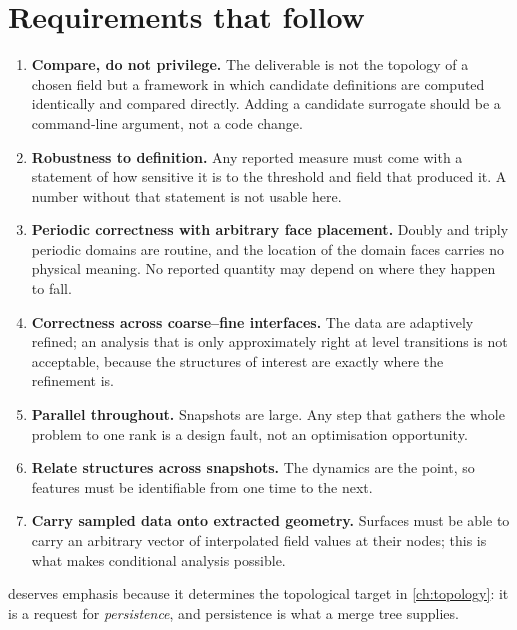 \section{Requirements that follow}

\begin{enumerate}[label=(R\arabic*),leftmargin=*]
\item\label{req:compare} \textbf{Compare, do not privilege.} The deliverable is
  not the topology of a chosen field but a framework in which candidate
  definitions are computed identically and compared directly. Adding a
  candidate surrogate should be a command-line argument, not a code change.
\item\label{req:robust} \textbf{Robustness to definition.} Any reported measure
  must come with a statement of how sensitive it is to the threshold and field
  that produced it. A number without that statement is not usable here.
\item\label{req:periodic} \textbf{Periodic correctness with arbitrary face
  placement.} Doubly and triply periodic domains are routine, and the location
  of the domain faces carries no physical meaning. No reported quantity may
  depend on where they happen to fall.
\item\label{req:amr} \textbf{Correctness across coarse--fine interfaces.} The
  data are adaptively refined; an analysis that is only approximately right at
  level transitions is not acceptable, because the structures of interest are
  exactly where the refinement is.
\item\label{req:parallel} \textbf{Parallel throughout.} Snapshots are large.
  Any step that gathers the whole problem to one rank is a design fault, not an
  optimisation opportunity.
\item\label{req:track} \textbf{Relate structures across snapshots.} The
  dynamics are the point, so features must be identifiable from one time to the
  next.
\item\label{req:sample} \textbf{Carry sampled data onto extracted geometry.}
  Surfaces must be able to carry an arbitrary vector of interpolated field
  values at their nodes; this is what makes conditional analysis possible.
\end{enumerate}

 deserves emphasis because it determines the topological
target in \cref{ch:topology}: it is a request for \emph{persistence}, and
persistence is what a merge tree supplies.
